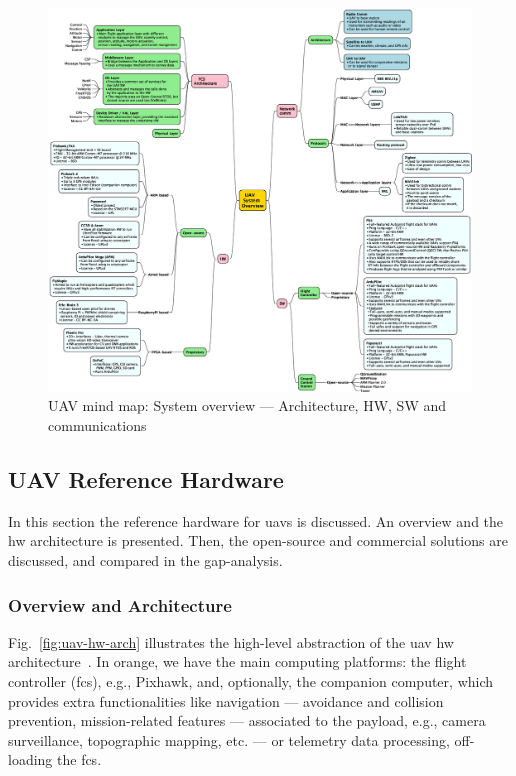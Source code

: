 \begin{figure}[!hbt]
  \centering
  \includegraphics[width=1.0\textwidth]{./img/eps/uav2-3-mindmap.eps} 
%   
  \caption{UAV mind map: System overview --- Architecture, HW, SW and communications}%
  \label{fig:uav-sysOverv-arch-mindmap}
\end{figure}

\subsection{UAV Reference Hardware}%
\label{sec:uav-ref-hw}
In this section the reference hardware for \glspl{uav} is discussed. An overview
and the \gls{hw} architecture is presented. Then, the open-source and
commercial solutions are discussed, and compared in the gap-analysis.

\subsubsection{Overview and Architecture}%
\label{sec:overv-arch-hw}
Fig.~\ref{fig:uav-hw-arch} illustrates the high-level abstraction of the
\gls{uav} \gls{hw} architecture~\cite{leccadito2018survey,px4-sysArch}. In orange, we have the main computing
platforms: the flight controller (\gls{fcs}), e.g., Pixhawk, and, optionally,
the companion computer, which provides extra functionalities like navigation ---
avoidance and collision prevention, mission-related features --- associated to
the payload, e.g., camera surveillance, topographic mapping, etc. --- or
telemetry data processing, off-loading the \gls{fcs}.

